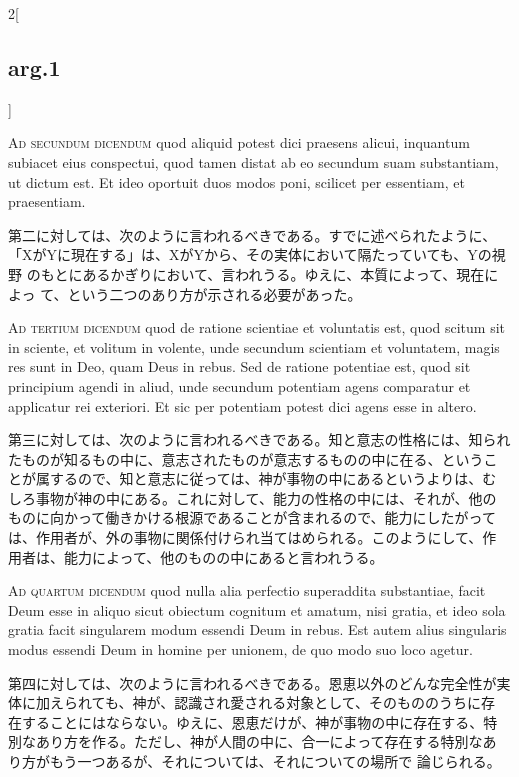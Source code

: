 \documentclass[paper=a4paper,fontsize=10pt,jafontsize=9pt,titlepage]{jlreq}
\begin{document}
\begin{paracol}{2}[\subsection{arg.1}]
\switchcolumn*[\subsection{ad.2}]

{\scshape Ad secundum dicendum} quod aliquid potest dici praesens alicui,
 inquantum subiacet eius conspectui, quod tamen distat ab eo secundum
 suam substantiam, ut dictum est. Et ideo oportuit duos modos poni,
 scilicet per essentiam, et praesentiam.

\switchcolumn

第二に対しては、次のように言われるべきである。すでに述べられたように、
 「XがYに現在する」は、XがYから、その実体において隔たっていても、Yの視野
 のもとにあるかぎりにおいて、言われうる。ゆえに、本質によって、現在によっ
 て、という二つのあり方が示される必要があった。

\switchcolumn*[\subsection{ad.3}]

{\scshape Ad tertium dicendum} quod de ratione scientiae et voluntatis est,
 quod scitum sit in sciente, et volitum in volente, unde secundum
 scientiam et voluntatem, magis res sunt in Deo, quam Deus in rebus. Sed
 de ratione potentiae est, quod sit principium agendi in aliud, unde
 secundum potentiam agens comparatur et applicatur rei exteriori. Et sic
 per potentiam potest dici agens esse in altero.

\switchcolumn

第三に対しては、次のように言われるべきである。知と意志の性格には、知られ
 たものが知るもの中に、意志されたものが意志するものの中に在る、というこ
 とが属するので、知と意志に従っては、神が事物の中にあるというよりは、む
 しろ事物が神の中にある。これに対して、能力の性格の中には、それが、他の
 ものに向かって働きかける根源であることが含まれるので、能力にしたがって
 は、作用者が、外の事物に関係付けられ当てはめられる。このようにして、作
 用者は、能力によって、他のものの中にあると言われうる。

\switchcolumn*[\subsection{ad.4}]

{\scshape Ad quartum dicendum} quod nulla alia perfectio superaddita
 substantiae, facit Deum esse in aliquo sicut obiectum cognitum et
 amatum, nisi gratia, et ideo sola gratia facit singularem modum essendi
 Deum in rebus. Est autem alius singularis modus essendi Deum in homine
 per unionem, de quo modo suo loco agetur.

\switchcolumn

第四に対しては、次のように言われるべきである。恩恵以外のどんな完全性が実
 体に加えられても、神が、認識され愛される対象として、そのもののうちに存
 在することにはならない。ゆえに、恩恵だけが、神が事物の中に存在する、特
 別なあり方を作る。ただし、神が人間の中に、合一によって存在する特別なあ
 り方がもう一つあるが、それについては、それについての場所で 論じられる。

\end{paracol}
\newpage
{}
\end{document}
